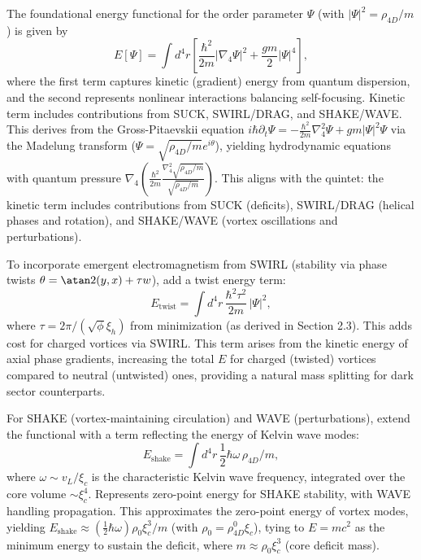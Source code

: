 The foundational energy functional for the order parameter $\Psi$ (with $|\Psi|^2 = \rho_{4D}/m$) is given by
\begin{equation}
E[\Psi] = \int d^4 r \left[ \frac{\hbar^2}{2m} |\nabla_4 \Psi|^2 + \frac{g m}{2} |\Psi|^4 \right],
\end{equation}
where the first term captures kinetic (gradient) energy from quantum dispersion, and the second represents nonlinear interactions balancing self-focusing. Kinetic term includes contributions from SUCK, SWIRL/DRAG, and SHAKE/WAVE. This derives from the Gross-Pitaevskii equation $i \hbar \partial_t \Psi = -\frac{\hbar^2}{2 m} \nabla_4^2 \Psi + g m |\Psi|^2 \Psi$ via the Madelung transform ($\Psi = \sqrt{\rho_{4D}/m} e^{i \theta}$), yielding hydrodynamic equations with quantum pressure $\nabla_4 \left( \frac{\hbar^2}{2 m} \frac{\nabla_4^2 \sqrt{\rho_{4D}/m}}{\sqrt{\rho_{4D}/m}} \right)$. This aligns with the quintet: the kinetic term includes contributions from SUCK (deficits), SWIRL/DRAG (helical phases and rotation), and SHAKE/WAVE (vortex oscillations and perturbations).

To incorporate emergent electromagnetism from SWIRL (stability via phase twists $\theta = \atan2(y, x) + \tau w$), add a twist energy term:
\begin{equation}
E_{\text{twist}} = \int d^4 r \, \frac{\hbar^2 \tau^2}{2m} \, |\Psi|^2,
\end{equation}
where $\tau = 2\pi / (\sqrt{\phi} \xi_h)$ from minimization (as derived in Section 2.3). This adds cost for charged vortices via SWIRL. This term arises from the kinetic energy of axial phase gradients, increasing the total $E$ for charged (twisted) vortices compared to neutral (untwisted) ones, providing a natural mass splitting for dark sector counterparts.

For SHAKE (vortex-maintaining circulation) and WAVE (perturbations), extend the functional with a term reflecting the energy of Kelvin wave modes:
\begin{equation}
E_{\text{shake}} = \int d^4 r \, \frac{1}{2} \hbar \omega \, \rho_{4D} / m,
\end{equation}
where $\omega \sim v_L / \xi_c$ is the characteristic Kelvin wave frequency, integrated over the core volume $\sim \xi_c^4$. Represents zero-point energy for SHAKE stability, with WAVE handling propagation. This approximates the zero-point energy of vortex modes, yielding $E_{\text{shake}} \approx (\frac{1}{2} \hbar \omega) \rho_0 \xi_c^3 / m$ (with $\rho_0 = \rho_{4D}^0 \xi_c$), tying to $E = m c^2$ as the minimum energy to sustain the deficit, where $m \approx \rho_0 \xi_c^3$ (core deficit mass).

